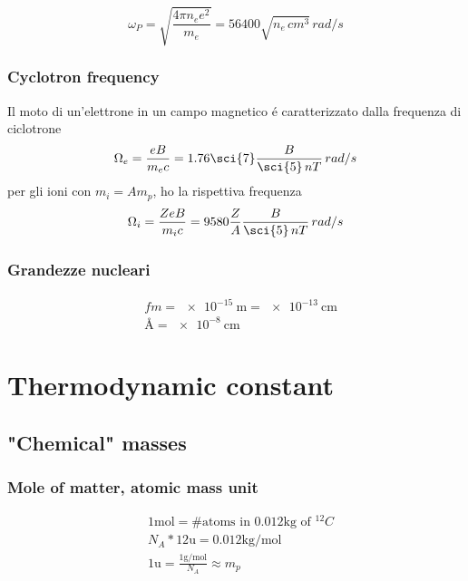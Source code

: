 \documentclass[oneside,12pt,fleqn]{memoir}
\begin{document}
\begin{equation*}
\omega_P=\sqrt{\frac{4\pi n_ee^2}{m_e}}=56400\sqrt{n_e\,cm^3}\,rad/s
\end{equation*}

\subsection{Cyclotron frequency}

Il moto di un'elettrone in un campo magnetico \'e caratterizzato dalla frequenza di ciclotrone
\begin{equation*}
\Omega_e=\frac{eB}{m_ec}=1.76\sci{7}\frac{B}{\sci{5}\,nT}\,rad/s
\end{equation*}
per gli ioni con $m_i=Am_p$, ho la rispettiva frequenza
\begin{equation*}
\Omega_i=\frac{ZeB}{m_ic}=9580\frac{Z}{A}\frac{B}{\sci{5}\,nT}\,rad/s
\end{equation*}

\subsection{Grandezze nucleari}

\begin{align*}
&fm=\SI{e-15}{\meter}=\SI{e-13}{\cm}\\
&\si{\angstrom}=\SI{e-8}{\cm}
\end{align*}

\chapter{Thermodynamic constant}
\PartialToc

\section{"Chemical" masses}

\subsection{Mole of matter, atomic mass unit}
\begin{align*}
&1\si{\mole}=\# \text{atoms in }0.012\si{\kilo\gram}\text{ of $^{12}C$}\\
&N_A*12 \si{\atomicmassunit}=0.012\si{\kilo\gram\per\mole}\\
&1\si{\atomicmassunit}=\frac{1\si{\gram\per\mole}}{N_A}\approx m_p
\end{align*}
\end{document}
